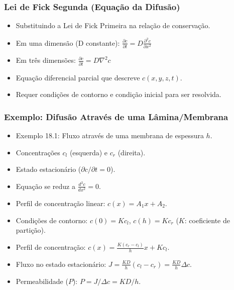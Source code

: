 \documentclass[11pt]{beamer}
\begin{document}
\begin{frame}
    \frametitle{Lei de Fick Segunda (Equação da Difusão)}
    \begin{itemize}
        \item Substituindo a Lei de Fick Primeira na relação de conservação.
        \item Em uma dimensão (D constante): $\frac{\partial c}{\partial t} = D \frac{\partial^2 c}{\partial x^2}$
        \item Em três dimensões: $\frac{\partial c}{\partial t} = D \nabla^2 c$
        \item Equação diferencial parcial que descreve $c(x,y,z,t)$.
        \item Requer condições de contorno e condição inicial para ser resolvida.
    \end{itemize}
\end{frame}

\begin{frame}
    \frametitle{Exemplo: Difusão Através de uma Lâmina/Membrana}
    \begin{itemize}
        \item Exemplo 18.1: Fluxo através de uma membrana de espessura $h$.
        \item Concentrações $c_l$ (esquerda) e $c_r$ (direita).
        \item Estado estacionário ($\partial c / \partial t = 0$).
        \item Equação se reduz a $\frac{d^2 c}{dx^2} = 0$.
        \item Perfil de concentração linear: $c(x) = A_1 x + A_2$.
        \item Condições de contorno: $c(0) = Kc_l$, $c(h) = Kc_r$ ($K$: coeficiente de partição).
        \item Perfil de concentração: $c(x) = \frac{K(c_r - c_l)}{h} x + Kc_l$.
        \item Fluxo no estado estacionário: $J = \frac{KD}{h}(c_l - c_r) = \frac{KD}{h}\Delta c$.
        \item Permeabilidade ($P$): $P = J/\Delta c = KD/h$.
    \end{itemize}
\end{frame}
\end{document}
